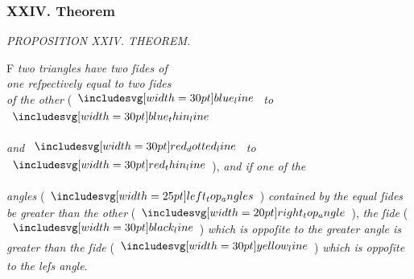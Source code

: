 \documentclass[11pt,preview]{standalone}
\begin{document}
\subsubsection{XXIV. Theorem}

\begin{minipage}[t]{0.43\textwidth}
    \vspace{20pt}
    
\end{minipage}%
\hfill
\begin{minipage}[t]{0.55\textwidth}
    \begin{center}
        \textit{PROPOSITION XXIV. THEOREM.}\label{book1pr24} \\
    \end{center}

    \hfill

    \begin{center}
        \raggedright \lettrine[lines=3, loversize=1, nindent=0pt]{}{}F \textit{two triangles have two ſides of\\ one reſpectively equal to two ſides\\ of the other} (\hspace{-1ex}$\blueline$ \textit{to} $\bluethinline$\\
    \end{center}
    \textit{and} $\dottedredline$ \textit{to} $\redthinline$\hspace{-1ex}), \textit{and if one of the}
\end{minipage}
\textit{angles} (\hspace{-1ex}$\img{left_top_angles}$\hspace{-1ex}) \textit{contained by} \textit{the equal ſides be greater than the other } (\hspace{-1ex}$\img[0][0][20]{right_top_angle}$\hspace{-1ex}), \textit{the ſide} (\hspace{-1ex}$\blackline$\hspace{-1ex}) \textit{which is oppoſite to the greater angle is greater than the ſide} (\hspace{-1ex}$\yellowline$\hspace{-1ex}) \textit{which is oppoſite to the leſs angle}.

\vspace{1ex}
\end{document}
